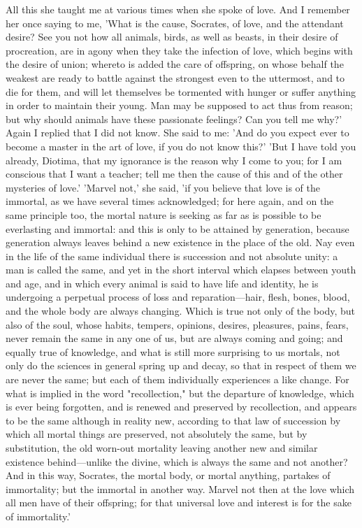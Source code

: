 \para[118] All this she taught me at various times when she spoke of love. And I remember her once saying to me, 'What is the cause, Socrates, of love, and the attendant desire? See you not how all animals, birds, as well as beasts, in their desire of procreation, are in agony when they take the infection of love, which begins with the desire of union; whereto is added the care of offspring, on whose behalf the weakest are ready to battle against the strongest even to the uttermost, and to die for them, and will let themselves be tormented with hunger or suffer anything in order to maintain their young. Man may be supposed to act thus from reason; but why should animals have these passionate feelings? Can you tell me why?' Again I replied that I did not know. She said to me: 'And do you expect ever to become a master in the art of love, if you do not know this?' 'But I have told you already, Diotima, that my ignorance is the reason why I come to you; for I am conscious that I want a teacher; tell me then the cause of this and of the other mysteries of love.' 'Marvel not,' she said, 'if you believe that love is of the immortal, as we have several times acknowledged; for here again, and on the same principle too, the mortal nature is seeking as far as is possible to be everlasting and immortal: and this is only to be attained by generation, because generation always leaves behind a new existence in the place of the old. Nay even in the life of the same individual there is succession and not absolute unity: a man is called the same, and yet in the short interval which elapses between youth and age, and in which every animal is said to have life and identity, he is undergoing a perpetual process of loss and reparation---hair, flesh, bones, blood, and the whole body are always changing. Which is true not only of the body, but also of the soul, whose habits, tempers, opinions, desires, pleasures, pains, fears, never remain the same in any one of us, but are always coming and going; and equally true of knowledge, and what is still more surprising to us mortals, not only do the sciences in general spring up and decay, so that in respect of them we are never the same; but each of them individually experiences a like change. For what is implied in the word "recollection," but the departure of knowledge, which is ever being forgotten, and is renewed and preserved by recollection, and appears to be the same although in reality new, according to that law of succession by which all mortal things are preserved, not absolutely the same, but by substitution, the old worn-out mortality leaving another new and similar existence behind---unlike the divine, which is always the same and not another? And in this way, Socrates, the mortal body, or mortal anything, partakes of immortality; but the immortal in another way. Marvel not then at the love which all men have of their offspring; for that universal love and interest is for the sake of immortality.'

